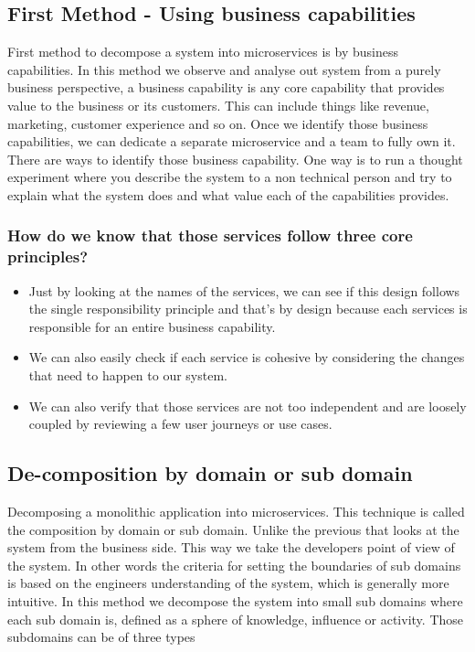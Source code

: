 \subsection{First Method - Using business capabilities}
First method to decompose a system into microservices is by business capabilities.
In this method we observe and analyse out system from a purely business perspective, a business capability is any core capability that provides value to the business or its customers.
This can include things like revenue, marketing, customer experience and so on.
Once we identify those business capabilities, we can dedicate a separate microservice and a team to fully own it.
There are ways to identify those business capability.
One way is to run a thought experiment where you describe the system to a non technical person and try to explain what the system does and what value each of the capabilities provides.


\subsubsection{How do we know that those services follow three core principles?}
\begin{itemize}
    \item Just by looking at the names of the services, we can see if this design follows the single responsibility principle and that's by design because each services is responsible for an entire business capability.
    \item We can also easily check if each service is cohesive by considering the changes that need to happen to our system.
    \item We can also verify that those services are not too independent and are loosely coupled by reviewing a few user journeys or use cases.
\end{itemize}

\subsection{De-composition by domain or sub domain}

Decomposing a monolithic application into microservices.
This technique is called the composition by domain or sub domain.
Unlike the previous that looks at the system from the business side.
This way we take the developers point of view of the system.
In other words the criteria for setting the boundaries of sub domains is based on the engineers understanding of the system, which is generally more intuitive.
In this method we decompose the system into small sub domains where each sub domain is, defined as a sphere of knowledge, influence or activity.
Those subdomains can be of three types

